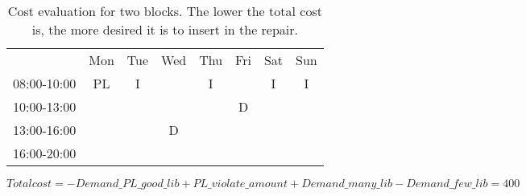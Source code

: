 \begin{table}[!h]
\centering
\caption{Cost evaluation for two blocks. The lower the total cost is, the more desired it is to insert in the repair.}
\label{tab:block_costs}
\begin{tabular}{cccccccc}
                                 & Mon                                             & Tue                    & Wed                                            & Thu                    & Fri                                            & Sat                    & Sun                    \\ \cline{2-8} 
\multicolumn{1}{c|}{08:00-10:00} & \multicolumn{1}{c|}{\cellcolor[HTML]{FCFF2F}PL} & \multicolumn{1}{c|}{I} & \multicolumn{1}{c|}{} & \multicolumn{1}{c|}{I} & \multicolumn{1}{c|}{} & \multicolumn{1}{c|}{I} & \multicolumn{1}{c|}{I} \\ \cline{2-8} 
\multicolumn{1}{c|}{10:00-13:00} & \multicolumn{1}{c|}{\cellcolor[HTML]{FCFF2F}}   & \multicolumn{1}{c|}{}  & \multicolumn{1}{c|}{} & \multicolumn{1}{c|}{}  & \multicolumn{1}{c|}{\cellcolor[HTML]{FCFF2F}D} &     &   \\ \cline{2-6}
\multicolumn{1}{c|}{13:00-16:00} & \multicolumn{1}{c|}{\cellcolor[HTML]{FCFF2F}}   & \multicolumn{1}{c|}{}  & \multicolumn{1}{c|}{\cellcolor[HTML]{FCFF2F}D} & \multicolumn{1}{c|}{}  & \multicolumn{1}{c|}{}         &            &          \\ \cline{2-6}
\multicolumn{1}{c|}{16:00-20:00} & \multicolumn{1}{c|}{}  & \multicolumn{1}{c|}{}  & \multicolumn{1}{c|}{} & \multicolumn{1}{c|}{}  & \multicolumn{1}{c|}{} &         &         \\ \cline{2-6}
\end{tabular}
\newline
$Total cost = -Demand\_PL\_good\_lib + PL\_violate\_amount + Demand\_many\_lib - Demand\_few\_lib = 400$


\end{table}
